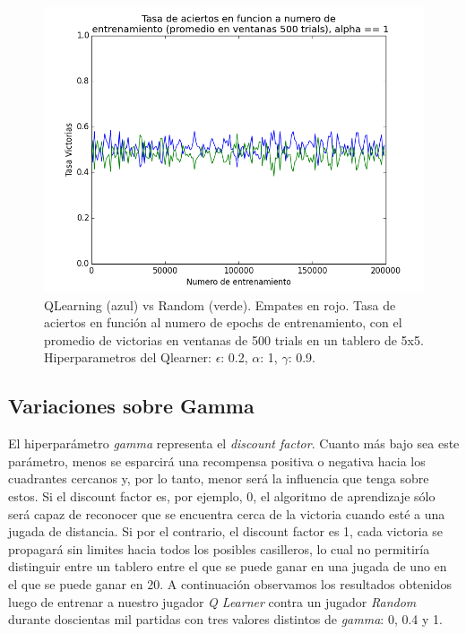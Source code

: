 \documentclass[10pt,a4paper]{article}
\begin{document}
\begin{figure}[H]
\centering
\includegraphics[scale=0.5]{images/q_vs_random_alpha_1_200_v2.png}
\caption{QLearning (azul) vs Random (verde). Empates en rojo. Tasa de aciertos en función al numero de epochs de entrenamiento, con el promedio de victorias en ventanas de 500 trials en un tablero de 5x5. Hiperparametros del Qlearner: $\epsilon$: 0.2, $\alpha$: 1, $\gamma$: 0.9.}
\end{figure}

\subsection{Variaciones sobre Gamma}

El hiperparámetro \textit{gamma} representa el \textit{discount factor}. Cuanto más bajo sea este parámetro, menos se esparcirá una recompensa positiva o negativa hacia los cuadrantes cercanos y, por lo tanto, menor será la influencia que tenga sobre estos. Si el discount factor es, por ejemplo, 0, el algoritmo de aprendizaje sólo será capaz de reconocer que se encuentra cerca de la victoria cuando esté a una jugada de distancia. Si por el contrario, el discount factor es 1, cada victoria se propagará sin limites hacia todos los posibles casilleros, lo cual no permitiría distinguir entre un tablero entre el que se puede ganar en una jugada de uno en el que se puede ganar en 20. A continuación observamos los resultados obtenidos luego de entrenar a nuestro jugador \textit{Q Learner} contra un jugador \textit{Random} durante doscientas mil partidas con tres valores distintos de \emph{gamma}: 0, 0.4 y 1.\\
\end{document}
